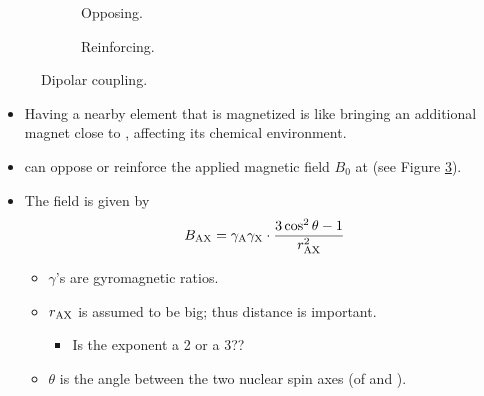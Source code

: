 \documentclass[../notes.tex]{subfiles}
\begin{document}
\begin{itemize}
\begin{enumerate}
\begin{figure}[h!]
\begin{subfigure}[b]{0.2\linewidth}
                \caption{Opposing.}
                \label{fig:dipolarCouplinga}
            \end{subfigure}
            \begin{subfigure}[b]{0.2\linewidth}
                \centering
                \caption{Reinforcing.}
                \label{fig:dipolarCouplingb}
            \end{subfigure}
            \caption{Dipolar coupling.}
            \label{fig:dipolarCoupling}
        \end{figure}
        \begin{itemize}
            \item Having a nearby element  that is magnetized is like bringing an additional magnet close to , affecting its chemical environment.
            \item {} can oppose or reinforce the applied magnetic field $B_0$ at  (see Figure \ref{fig:dipolarCoupling}).
            \item The field is given by
            \begin{equation*}
                B_{\ce{AX}} = \gamma_{\ce{A}}\gamma_{\ce{X}}\cdot\frac{3\cos^2\theta-1}{r_{\ce{AX}}^2}
            \end{equation*}
            \begin{itemize}
                \item $\gamma$'s are gyromagnetic ratios.
                \item $r_{\ce{AX}}$ is assumed to be big; thus distance is important.
                \begin{itemize}
                    \item Is the exponent a 2 or a 3??
                \end{itemize}
                \item $\theta$ is the angle between the two nuclear spin axes (of  and ).

\end{itemize}
\end{itemize}
\end{enumerate}
\end{itemize}
\end{document}
